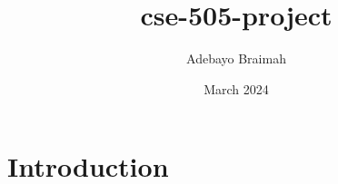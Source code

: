 \documentclass{article}
\title{cse-505-project}
\author{Adebayo Braimah}
\date{March 2024}
\begin{document}
\maketitle

\section{Introduction}
\end{document}
